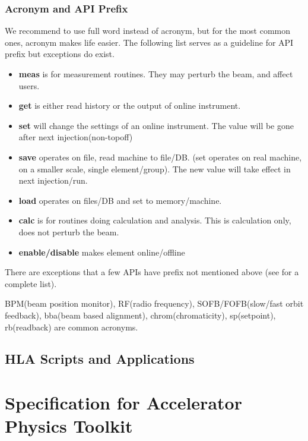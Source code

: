 \documentclass[letterpaper,showtrims]{memoir}
\newcommand{\code}[1]{\texttt{#1}}
\newcommand{\strong}[1]{{\bfseries #1}}
\begin{document}
\subsection{Acronym and API Prefix}

We recommend to use full word instead of acronym, but for the most
common ones, acronym makes life easier. The following list serves as a
guideline for API prefix but exceptions do exist.
\begin{itemize}
\item \strong{meas} is for measurement routines. They may perturb the beam, and affect users.
\item \strong{get} is either read history or the output of online instrument.
\item \strong{set} will change the settings of an online instrument. The value will be gone after next injection(non-topoff)
\item \strong{save} operates on file, read machine to file/DB. (set operates on real machine, on a smaller scale, single element/group). The new value will take effect in next injection/run. 
\item \strong{load} operates on files/DB and set to memory/machine.
\item \strong{calc} is for routines doing calculation and analysis. This is calculation only, does not perturb the beam.
\item \strong{enable/disable} makes element online/offline
\end{itemize}

There are exceptions that a few APIs have prefix not mentioned above
(see \cite{shen_hla_apis} for a complete list).

BPM(beam position monitor), RF(radio frequency), SOFB/FOFB(slow/fast
orbit feedback), bba(beam based alignment), chrom(chromaticity),
sp(setpoint), rb(readback) are common acronyms.


\section{HLA Scripts and Applications}



\chapter{Specification for Accelerator Physics Toolkit}
\end{document}
